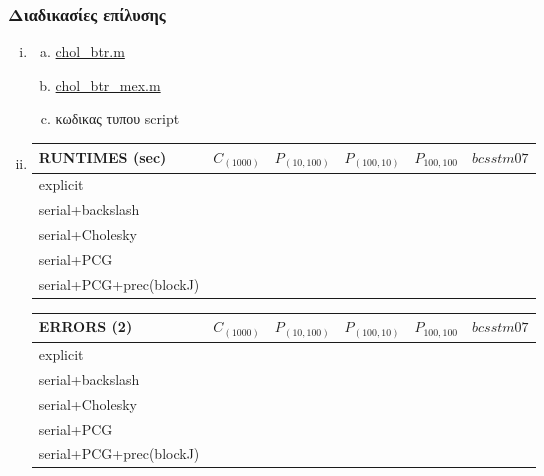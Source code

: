\documentclass{article}
\begin{document}
\subsubsection{Διαδικασίες επίλυσης}
\begin{enumerate}[i.]
    \item 
    \begin{enumerate}[a.]
        \item \href{run:./chol_btr.m}{chol\_btr.m}
        \item \href{run:./chol_btr_mex.m}{chol\_btr\_mex.m}
        \item κωδικας τυπου script
    \end{enumerate}
    \item 
    \begin{tabular}{ |p{4.5cm}||p{1cm}|p{1cm}|p{2cm}|p{1cm}|p{2cm}|}
        \hline
        RUNTIMES (sec) & $C_{(1000)}$ & $P_{(10,100)}$ & $P_{(100,10)}$ & $P_{100,100}$ & $bcsstm07$\\
        \hline
        explicit &&&&&\\
        \hline
        serial+backslash&&&&&\\
        \hline
        serial+Cholesky&&&&&\\
        \hline
        serial+PCG&&&&&\\
        \hline
        serial+PCG+prec(blockJ)&&&&&\\
        \hline
        \end{tabular}  
        
        
    \begin{tabular}{ |p{4.5cm}||p{1.5cm}|p{1.5cm}|p{1.5cm}|p{1.5cm}|p{2cm}|}
        \hline
        ERRORS (2) & $C_{(1000)}$ & $P_{(10,100)}$ & $P_{(100,10)}$ & $P_{100,100}$ & $bcsstm07$\\
        \hline
        explicit &&&&&\\
        \hline
        serial+backslash&&&&&\\
        \hline
        serial+Cholesky&&&&&\\
        \hline
        serial+PCG&&&&&\\
        \hline
        serial+PCG+prec(blockJ)&&&&&\\
        \hline
        \end{tabular}
\end{enumerate}

\end{document}
